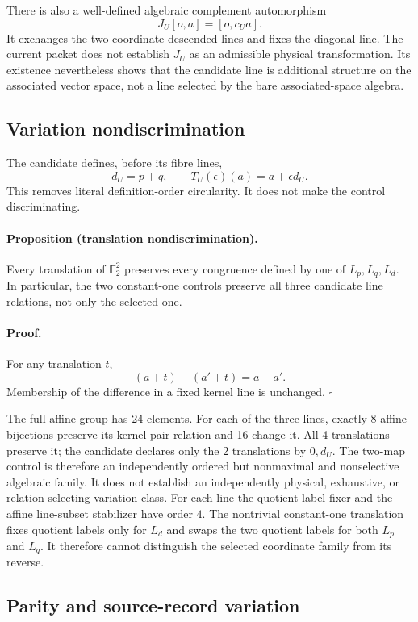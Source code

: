 There is also a well-defined algebraic complement automorphism
\[
 J_U[o,a]=[o,c_Ua].
\]
It exchanges the two coordinate descended lines and fixes the diagonal line.
The current packet does not establish \(J_U\) as an admissible physical
transformation.  Its existence nevertheless shows that the candidate line is
additional structure on the associated vector space, not a line selected by
the bare associated-space algebra.

\subsection{Variation nondiscrimination}

The candidate defines, before its fibre lines,
\[
 d_U=p+q,\qquad T_U(\epsilon)(a)=a+\epsilon d_U.
\]
This removes literal definition-order circularity.  It does not make the
control discriminating.

\paragraph{Proposition (translation nondiscrimination).}
Every translation of \(\mathbb F_2^2\) preserves every congruence defined by
one of \(L_p,L_q,L_d\).  In particular, the two constant-one controls preserve
all three candidate line relations, not only the selected one.

\paragraph{Proof.}
For any translation \(t\),
\[
 (a+t)-(a'+t)=a-a'.
\]
Membership of the difference in a fixed kernel line is unchanged. \(\square\)

The full affine group has 24 elements.  For each of the three lines, exactly
8 affine bijections preserve its kernel-pair relation and 16 change it.  All
4 translations preserve it; the candidate declares only the 2 translations
by \(0,d_U\).  The two-map control is therefore an independently ordered but
nonmaximal and nonselective algebraic family.  It does not establish an
independently physical, exhaustive, or relation-selecting variation class.
For each line the quotient-label fixer and the affine line-subset stabilizer
have order \(4\).  The nontrivial constant-one translation fixes quotient
labels only for \(L_d\) and swaps the two quotient labels for both \(L_p\) and
\(L_q\).  It therefore cannot distinguish the selected coordinate family
from its reverse.

\subsection{Parity and source-record variation}

